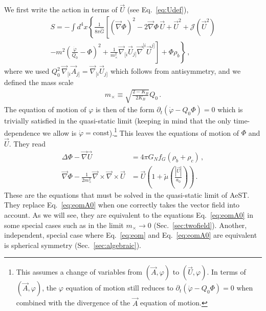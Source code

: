 \documentclass[reprint, amsmath,amssymb, nofootinbib, aps, prd]{revtex4-2}
\begin{document}
We first write the action in terms of $\vec{U}$ (see Eq.~\eqref{eq:Udef}),
\begin{multline}
 \label{eq:actionwithU}
 S = - \int d^4x \left\{\frac{1}{8 \pi \hat{G}} \left[ (\vec{\nabla} \Phi)^2 - 2 \vec{\nabla} \Phi \, \vec{U} + \vec{U}^2 + \mathcal{J}\left(\vec{U}^2\right)\right.\right.\\
\left.\left. - m^2 \left(\frac{\dot{\varphi}}{Q_0} - \Phi\right)^2  +
\frac{1}{m_\times^2} \vec{\nabla}_{[i} \vec{U}_{j]}  \vec{\nabla}^{[i} \vec{U}^{j]}  \right] + \Phi \rho_b \right\} \,,
\end{multline}
where we used $Q_0^2 \, \vec{\nabla}_{[i} \vec{A}_{j]} = \vec{\nabla}_{[i} \vec{U}_{j]}$ which follows from antisymmetry, and we defined the mass scale
\begin{align}
 m_\times \equiv \sqrt{\frac{2 - K_B}{2 K_B}} Q_0 \,.
\end{align}
The equation of motion of $\varphi$ is then of the form $\partial_t(\dot\varphi - Q_0 \Phi) = 0$ which is trivially satisfied in the quasi-static limit (keeping in mind that the only time-dependence we allow is $\dot{\varphi} = \mathrm{const}$).\footnote{
  This assumes a change of variables from $(\vec{A}, \varphi)$ to $(\vec{U}, \varphi)$.
  In terms of $(\vec{A}, \varphi)$, the $\varphi$ equation of motion still reduces to $\partial_t(\dot{\varphi} - Q_0 \Phi) = 0$ when combined with the divergence of the $\vec{A}$ equation of motion.
}
This leaves the equations of motion of $\Phi$ and $\vec{U}$.
They read
\begin{subequations}
\label{eq:eom}
\begin{align}
 \label{eq:eom:Phi}
 \Delta \Phi - \vec{\nabla} \vec{U} &= 4 \pi G_N f_G (\rho_b + \rho_c) \,, \\
 \label{eq:eom:U}
 \vec{\nabla} \Phi - \frac{1}{2 m_\times^2} \vec{\nabla} \times \vec{\nabla} \times \vec{U} &= \vec{U} \left(1 + \tilde{\mu}\left(\frac{|\vec{U}|}{a_0}\right) \right) \,.
\end{align}
\end{subequations}
These are the equations that must be solved in the quasi-static limit of AeST.
They replace Eq.~\eqref{eq:eomA0} when one correctly takes the vector field into account.
As we will see, they are equivalent to the equations Eq.~\eqref{eq:eomA0} in some special cases such as in the limit $m_\times \to 0$ (Sec.~\ref{sec:twofield}).
Another, independent, special case where Eq.~\eqref{eq:eom} and Eq.~\eqref{eq:eomA0} are equivalent is spherical symmetry (Sec.~\ref{sec:algebraic}).
\end{document}
